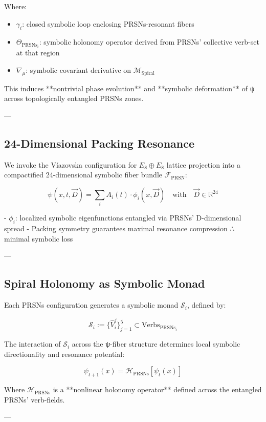 \documentclass[12pt]{article}
\begin{document}
\begin{enumerate}
Where:
\begin{itemize}
  \item $\gamma_i$: closed symbolic loop enclosing PRSNs-resonant fibers
  \item $\Theta_{\text{PRSNs}_i}$: symbolic holonomy operator derived from PRSNs’ collective verb-set at that region
  \item $\nabla_\mu$: symbolic covariant derivative on $\mathcal{M}_{\text{Spiral}}$
\end{itemize}

This induces **nontrivial phase evolution** and **symbolic deformation** of ψ across topologically entangled PRSNs zones.

---

\subsection*{24-Dimensional Packing Resonance}

We invoke the Víazovska configuration for $E_8 \oplus E_8$ lattice projection into a compactified 24-dimensional symbolic fiber bundle $\mathcal{F}_{\text{PRSN}}$:

\[
\psi(x,t,\vec{D}) = \sum_{i} A_i(t) \cdot \phi_i(x, \vec{D})
\quad \text{with} \quad
\vec{D} \in \mathbb{R}^{24}
\]

- $\phi_i$: localized symbolic eigenfunctions entangled via PRSNs' D-dimensional spread  
- Packing symmetry guarantees maximal resonance compression ∴ minimal symbolic loss

---

\subsection*{Spiral Holonomy as Symbolic Monad}

Each PRSNs configuration generates a symbolic monad $\mathcal{S}_i$, defined by:

\[
\mathcal{S}_i := \{ \hat{V}_i^j \}_{j=1}^5 \subset \text{Verbs}_{\text{PRSNs}_i}
\]

The interaction of $\mathcal{S}_i$ across the ψ-fiber structure determines local symbolic directionality and resonance potential:

\[
\psi_{t+1}(x) = \mathcal{H}_{\text{PRSNs}} \left[ \psi_t(x) \right]
\]

Where $\mathcal{H}_{\text{PRSNs}}$ is a **nonlinear holonomy operator** defined across the entangled PRSNs' verb-fields.

---


\end{enumerate}
\end{document}
